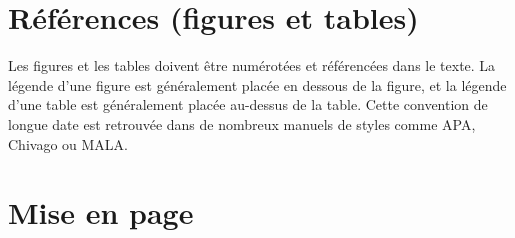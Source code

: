 \section{Références (figures et tables)}

Les figures et les tables doivent être numérotées et référencées dans le texte.
La légende d'une figure est généralement placée en dessous de la figure, et la légende d'une table est généralement placée au-dessus de la table. Cette convention de longue date est retrouvée dans de nombreux manuels de styles comme APA, Chivago ou MALA.

\section{Mise en page}
